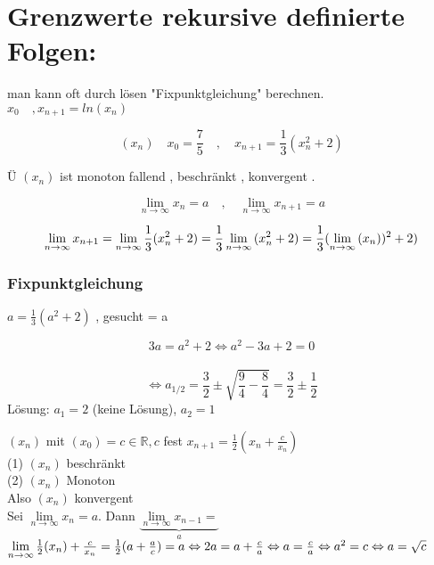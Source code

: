 \newpage

\section{Grenzwerte rekursive definierte Folgen:}

man kann oft durch lösen "Fixpunktgleichung" berechnen.\\
$x_0 \quad , x_{n+1}= ln(x_n)$

\begin{example}
	\[(x_n) \quad x_0 = \frac{7}{5} \quad,\quad x_{n+1}= \frac{1}{3}(x_n^2+2)  \]
	
	Ü $(x_n)$ ist monoton fallend , beschränkt , konvergent . 
	
	\[\lim\limits_{n \rightarrow \infty}{x_n}=a \quad,\quad 
	\lim\limits_{n \rightarrow \infty}{x_{n+1}}=a \]
	
	\begin{equation*}
	\begin{aligned}
	\lim\limits_{n \rightarrow \infty}{x_{n+1}} 
	= \linebreak  
	\lim\limits_{n \rightarrow \infty}{\frac{1}{3}(x_n^2 + 2)=
		\frac{1}{3}} \lim\limits_{n \rightarrow \infty}{(x_n^2 + 2)}
	=
	\frac{1}{3} (\lim\limits_{n \rightarrow \infty}{(x_n))^2 + 2)}
	\end{aligned}
	\end{equation*}
\end{example}

\subsubsection{Fixpunktgleichung }
$a = \frac{1}{3}(a^2 + 2) $  , gesucht = a

\[ 3a = a^2 +2 \Leftrightarrow a^2 -3a+2 = 0 \] \\
\[ \Leftrightarrow a_{1/2} = \frac{3}{2} \pm \sqrt{\frac{9}{4}-\frac{8}{4}}= \frac{3}{2} \pm \frac{1}{2}\]
Lösung:  $a_1 = 2$ (keine Lösung),  $a_2 =1 $

\begin{example}{$(x_n)$ mit $(x_0) = c \in \mathbb{R} , c  $ fest $x_{n+1}= \frac{1}{2}(x_n+\frac{c}{x_n})$ }\\
	(1) $(x_n)$ beschränkt \checkmark\\
	(2) $(x_n)$ Monoton \checkmark\\
	Also $(x_n)$ konvergent \\
	Sei $\lim\limits_{n \rightarrow \infty}{x_n}= a $. 
	Dann $\underbrace{\lim\limits_{n \rightarrow \infty}{x_{n-1}}= }_{a}$ $\lim\limits_{n \rightarrow \infty}{\frac{1}{2}}(x_n) + \frac{c}{x_n} = \frac{1}{2}(a + \frac{a}{c})= a \\
	\Leftrightarrow 2a = a + \frac{c}{a} \Leftrightarrow a = \frac{c}{a } \Leftrightarrow a^2 = c \Leftrightarrow a = \sqrt{c}$
\end{example}


